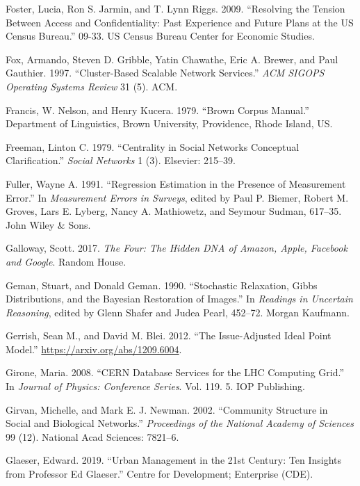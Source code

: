 \documentclass[]{krantz}
\begin{document}
\hypertarget{ref-foster2009resolving}{}
Foster, Lucia, Ron S. Jarmin, and T. Lynn Riggs. 2009. ``Resolving the
Tension Between Access and Confidentiality: Past Experience and Future
Plans at the US Census Bureau.'' 09-33. US Census Bureau Center for
Economic Studies.

\hypertarget{ref-fox1997cluster}{}
Fox, Armando, Steven D. Gribble, Yatin Chawathe, Eric A. Brewer, and
Paul Gauthier. 1997. ``Cluster-Based Scalable Network Services.''
\emph{ACM SIGOPS Operating Systems Review} 31 (5). ACM.

\hypertarget{ref-browncorpus}{}
Francis, W. Nelson, and Henry Kucera. 1979. ``Brown Corpus Manual.''
Department of Linguistics, Brown University, Providence, Rhode Island,
US.

\hypertarget{ref-freeman1979centrality}{}
Freeman, Linton C. 1979. ``Centrality in Social Networks Conceptual
Clarification.'' \emph{Social Networks} 1 (3). Elsevier: 215--39.

\hypertarget{ref-fuller1991regression}{}
Fuller, Wayne A. 1991. ``Regression Estimation in the Presence of
Measurement Error.'' In \emph{Measurement Errors in Surveys}, edited by
Paul P. Biemer, Robert M. Groves, Lars E. Lyberg, Nancy A. Mathiowetz,
and Seymour Sudman, 617--35. John Wiley \& Sons.

\hypertarget{ref-galloway2017four}{}
Galloway, Scott. 2017. \emph{The Four: The Hidden DNA of Amazon, Apple,
Facebook and Google}. Random House.

\hypertarget{ref-geman-90}{}
Geman, Stuart, and Donald Geman. 1990. ``Stochastic Relaxation, Gibbs
Distributions, and the Bayesian Restoration of Images.'' In
\emph{Readings in Uncertain Reasoning}, edited by Glenn Shafer and Judea
Pearl, 452--72. Morgan Kaufmann.

\hypertarget{ref-gerrish-12}{}
Gerrish, Sean M., and David M. Blei. 2012. ``The Issue-Adjusted Ideal
Point Model.'' \url{https://arxiv.org/abs/1209.6004}.

\hypertarget{ref-girone2008cern}{}
Girone, Maria. 2008. ``CERN Database Services for the LHC Computing
Grid.'' In \emph{Journal of Physics: Conference Series}. Vol. 119. 5.
IOP Publishing.

\hypertarget{ref-girvan2002community}{}
Girvan, Michelle, and Mark E. J. Newman. 2002. ``Community Structure in
Social and Biological Networks.'' \emph{Proceedings of the National
Academy of Sciences} 99 (12). National Acad Sciences: 7821--6.

\hypertarget{ref-glaeser2019urban}{}
Glaeser, Edward. 2019. ``Urban Management in the 21st Century: Ten
Insights from Professor Ed Glaeser.'' Centre for Development; Enterprise
(CDE).
\end{document}
